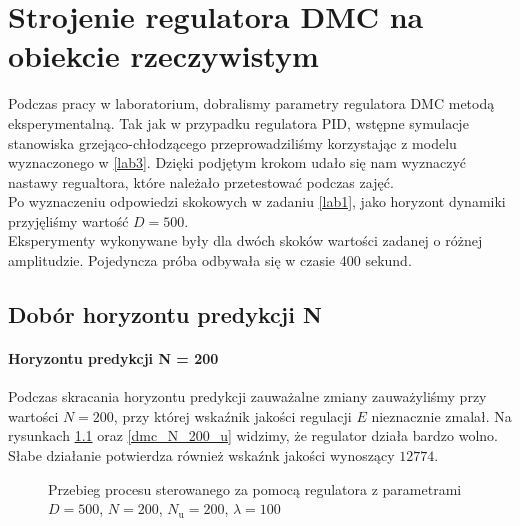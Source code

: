 \chapter{Strojenie regulatora DMC na obiekcie rzeczywistym}
\label{lab5_dmc}
Podczas pracy w laboratorium, dobralismy parametry regulatora DMC metodą eksperymentalną. Tak jak w przypadku regulatora PID, wstępne symulacje stanowiska grzejąco-chłodzącego przeprowadziliśmy korzystając z modelu wyznaczonego w \ref{lab3}. Dzięki podjętym krokom udało się nam wyznaczyć nastawy regualtora, które należało przetestować podczas zajęć.\\
\indent{} Po wyznaczeniu odpowiedzi skokowych w zadaniu \ref{lab1}, jako horyzont dynamiki przyjęliśmy wartość $D = 500$.\\
\indent{} Eksperymenty wykonywane były dla dwóch skoków wartości zadanej o różnej amplitudzie. Pojedyncza próba odbywała się w czasie 400 sekund.

\section{Dobór horyzontu predykcji N}
\subsubsection{Horyzontu predykcji N = 200}
Podczas skracania horyzontu predykcji zauważalne zmiany zauważyliśmy przy wartości $N = 200$, przy której wskaźnik jakości regulacji $E$ nieznacznie zmalał. Na rysunkach \ref{dmc_N_200_y} oraz \ref{dmc_N_200_u} widzimy, że regulator działa bardzo wolno. Słabe działanie potwierdza również wskaźnk jakości wynoszący $\num{12774}$.

\begin{figure}[t]
    \centering
    \caption{Przebieg procesu sterowanego za pomocą regulatora z parametrami $D = 500$, $N = 200$, $N_{\mathrm{u}} = 200$, $\lambda = 100$}
    \label{dmc_N_200_y}
\end{figure}

